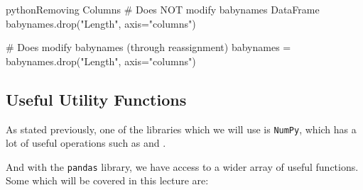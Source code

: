 \documentclass[openany]{book}
\begin{document}
\begin{code}{python}{Removing Columns}
# Does NOT modify babynames DataFrame
babynames.drop("Length", axis="columns")

# Does modify babynames (through reassignment)
babynames = babynames.drop("Length", axis="columns")
\end{code}

\subsection{Useful Utility Functions}
As stated previously, one of the libraries which we will use is \texttt{NumPy}, which has a lot of useful operations such as  and .

And with the \texttt{pandas} library, we have access to a wider array of useful functions. Some which will be covered in this lecture are:
\end{document}
